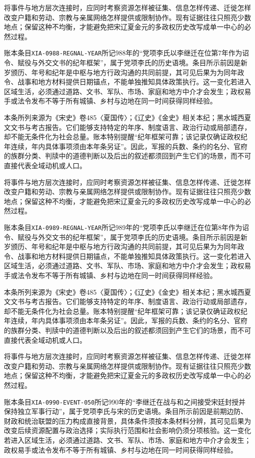 将事件与地方层次连接时，应同时考察资源怎样被征集、信息怎样传递、迁徙怎样改变户籍和劳动、宗教与亲属网络怎样提供或限制协作。现有证据往往只照亮少数地点；保留这种不均衡，才能避免把宋辽夏金元的多政权历史改写成单一中心的必然过程。

账本条目\texttt{XIA-0988-REGNAL-YEAR}所记988年的“党项李氏以李继迁在位第7年作为诏令、赋役与外交文书的纪年框架”，属于党项李氏的历史语境。条目所示前因是新岁颁历、年号和纪年是中枢与地方行政沟通的共同前提，其可见后果为为同年政令、战事和地方材料提供日期锚点，不能单独推知具体政策执行。这一变化若进入区域生活，必须通过道路、文书、军队、市场、家庭和地方中介才会发生；政权易手或法令发布不等于所有城镇、乡村与边地在同一时间获得同样经验。

本条所列来源为《宋史》卷485〈夏国传〉；《辽史》《金史》相关本纪；黑水城西夏文文书与考古报告。它们能够支持特定的年序、制度语言、政治行动或局部遗存，却不能无条件化为社会总量。账本特别提醒“纪年框架可靠；该记录仅确证政权纪年连续，年内具体事项须由本年条另证”。因此，军报的兵数、条约的名分、官府的族群分类、判牍中的道德判断以及后出的叙述都须回到产生它们的场景，而不可直接代表全域动机或人口。

将事件与地方层次连接时，应同时考察资源怎样被征集、信息怎样传递、迁徙怎样改变户籍和劳动、宗教与亲属网络怎样提供或限制协作。现有证据往往只照亮少数地点；保留这种不均衡，才能避免把宋辽夏金元的多政权历史改写成单一中心的必然过程。

账本条目\texttt{XIA-0989-REGNAL-YEAR}所记989年的“党项李氏以李继迁在位第8年作为诏令、赋役与外交文书的纪年框架”，属于党项李氏的历史语境。条目所示前因是新岁颁历、年号和纪年是中枢与地方行政沟通的共同前提，其可见后果为为同年政令、战事和地方材料提供日期锚点，不能单独推知具体政策执行。这一变化若进入区域生活，必须通过道路、文书、军队、市场、家庭和地方中介才会发生；政权易手或法令发布不等于所有城镇、乡村与边地在同一时间获得同样经验。

本条所列来源为《宋史》卷485〈夏国传〉；《辽史》《金史》相关本纪；黑水城西夏文文书与考古报告。它们能够支持特定的年序、制度语言、政治行动或局部遗存，却不能无条件化为社会总量。账本特别提醒“纪年框架可靠；该记录仅确证政权纪年连续，年内具体事项须由本年条另证”。因此，军报的兵数、条约的名分、官府的族群分类、判牍中的道德判断以及后出的叙述都须回到产生它们的场景，而不可直接代表全域动机或人口。

将事件与地方层次连接时，应同时考察资源怎样被征集、信息怎样传递、迁徙怎样改变户籍和劳动、宗教与亲属网络怎样提供或限制协作。现有证据往往只照亮少数地点；保留这种不均衡，才能避免把宋辽夏金元的多政权历史改写成单一中心的必然过程。

账本条目\texttt{XIA-0990-EVENT-050}所记990年的“李继迁在战与和之间接受宋廷封授并保持独立军事行动”，属于党项李氏与宋的历史语境。条目所示前因是前期边防、财政和统治联盟的压力构成直接背景，具体条件须按本条材料分辨，其可见后果为改变后续资源配置与政治选择；实际执行范围和社会影响仍须分项核验。这一变化若进入区域生活，必须通过道路、文书、军队、市场、家庭和地方中介才会发生；政权易手或法令发布不等于所有城镇、乡村与边地在同一时间获得同样经验。

